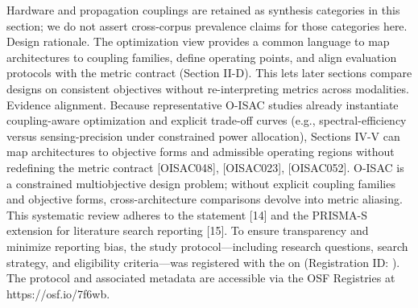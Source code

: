 {}Hardware and propagation couplings are retained as synthesis categories in this section; we do not assert cross-corpus prevalence claims for those categories here.\markdownRendererInterblockSeparator
{}
\markdownRendererSectionEnd \markdownRendererSectionBegin
{}\markdownRendererInterblockSeparator
{}Design rationale. The optimization view provides a common language to map architectures to coupling families, define operating points, and align evaluation protocols with the metric contract (Section II-D). This lets later sections compare designs on consistent objectives without re-interpreting metrics across modalities.\markdownRendererParagraphSeparator
{}Evidence alignment. Because representative O-ISAC studies already instantiate coupling-aware optimization and explicit trade-off curves (e.g., spectral-efficiency versus sensing-precision under constrained power allocation), Sections IV-V can map architectures to objective forms and admissible operating regions without redefining the metric contract [O\markdownRendererUnderscore{}ISAC\markdownRendererUnderscore{}048], [O\markdownRendererUnderscore{}ISAC\markdownRendererUnderscore{}023], [O\markdownRendererUnderscore{}ISAC\markdownRendererUnderscore{}052].\markdownRendererParagraphSeparator
{} O-ISAC is a constrained multiobjective design problem; without explicit coupling families and objective forms, cross-architecture comparisons devolve into metric aliasing.\markdownRendererInterblockSeparator
{}
\markdownRendererSectionEnd 
\markdownRendererSectionEnd 
\markdownRendererSectionEnd \markdownRendererSectionBegin
{}\markdownRendererInterblockSeparator
{}\markdownRendererSectionBegin
{}\markdownRendererInterblockSeparator
{}This systematic review adheres to the  statement [14] and the PRISMA-S extension for literature search reporting [15]. To ensure transparency and minimize reporting bias, the study protocol—including research questions, search strategy, and eligibility criteria—was registered with the  on  (Registration ID: ). The protocol and associated metadata are accessible via the OSF Registries at https://osf.io/7f6wb.\markdownRendererInterblockSeparator
